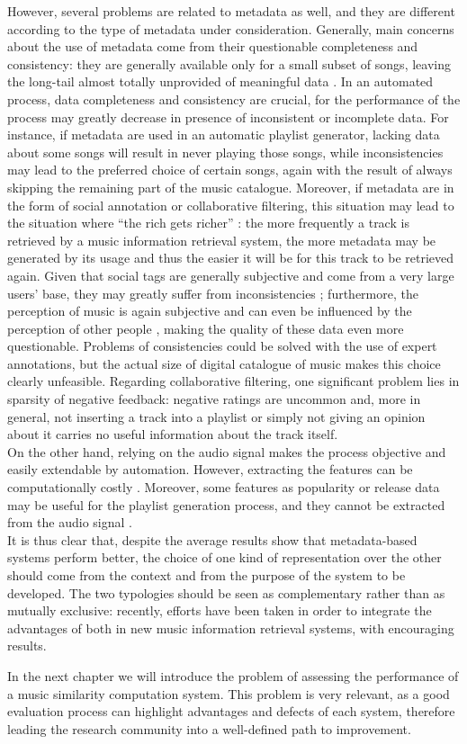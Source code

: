 However, several problems are related to metadata as well, and they are different according to the type of metadata under consideration. Generally, main concerns about the use of metadata come from their questionable completeness and consistency: they are generally available only for a small subset of songs, leaving the long-tail almost totally unprovided of meaningful data \cite{celma2010}. In an automated process, data completeness and consistency are crucial, for the performance of the process may greatly decrease in presence of inconsistent or incomplete data. For instance, if metadata are used in an automatic playlist generator, lacking data about some songs will result in never playing those songs, while inconsistencies may lead to the preferred choice of certain songs, again with the result of always skipping the remaining part of the music catalogue. Moreover, if metadata are in the form of social annotation or collaborative filtering, this situation may lead to the situation where ``the rich gets richer'' \cite{bogdanov13}: the more frequently a track is retrieved by a music information retrieval system, the more metadata may be generated by its usage and thus the easier it will be for this track to be retrieved again. Given that social tags are generally subjective and come from a very large users' base, they may greatly suffer from inconsistencies \cite{celma2010}; furthermore, the perception of music is again subjective and can even be influenced by the perception of other people \cite{mcdermott12}, making the quality of these data even more questionable. Problems of consistencies could be solved with the use of expert annotations, but the actual size of digital catalogue of music makes this choice clearly unfeasible. Regarding collaborative filtering, one significant problem lies in sparsity of negative feedback: negative ratings are uncommon and, more in general, not inserting a track into a playlist or simply not giving an opinion about it carries no useful information about the track itself. \\
On the other hand, relying on the audio signal makes the process objective and easily extendable by automation. However, extracting the features can be computationally costly \cite{schma13}. Moreover, some features as popularity or release data may be useful for the playlist generation process, and they cannot be extracted from the audio signal \cite{celma08}.\\
It is thus clear that, despite the average results show that metadata-based systems perform better, the choice of one kind of representation over the other should come from the context and from the purpose of the system to be developed. The two typologies should be seen as complementary rather than as mutually exclusive: recently, efforts have been taken in order to integrate the advantages of both in new music information retrieval systems, with encouraging results. 


In the next chapter we will introduce the problem of assessing the performance of a music similarity computation system. This problem is very relevant, as a good evaluation process can highlight advantages and defects of each system, therefore leading the research community into a well-defined path to improvement.